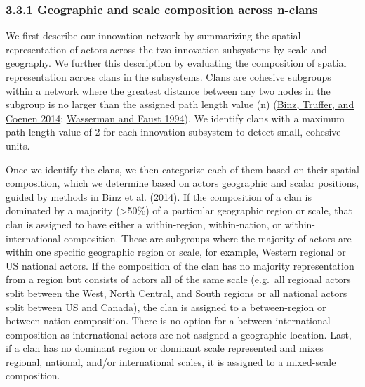 \documentclass[twoside,12pt,final]{ucthesis-CA2012}
\begin{document}
\begin{ucmainmatter}
\hypertarget{geographic-and-scale-composition-across-n-clans}{%
\subsubsection{3.3.1 Geographic and scale composition across n-clans}\label{geographic-and-scale-composition-across-n-clans}}

We first describe our innovation network by summarizing the spatial
representation of actors across the two innovation subsystems by scale
and geography. We further this description by evaluating the composition
of spatial representation across clans in the subsystems. Clans are
cohesive subgroups within a network where the greatest distance between
any two nodes in the subgroup is no larger than the assigned path length
value (n)
(\protect\hyperlink{ref-Binz_Truffer_Coenen_2014}{Binz, Truffer, and Coenen 2014}; \protect\hyperlink{ref-Wasserman_Faust_1994}{Wasserman and Faust 1994}).
We identify clans with a maximum path length value of 2 for each
innovation subsystem to detect small, cohesive units.

Once we identify the clans, we then categorize each of them based on
their spatial composition, which we determine based on actors\textquotesingle{}
geographic and scalar positions, guided by methods in Binz et al.
(2014). If the composition of a clan is dominated by a majority (\textgreater50\%)
of a particular geographic region or scale, that clan is assigned to
have either a \textquotesingle within-region\textquotesingle, \textquotesingle within-nation\textquotesingle, or
\textquotesingle within-international\textquotesingle{} composition. These are subgroups where the
majority of actors are within one specific geographic region or scale,
for example, Western regional or US national actors. If the composition
of the clan has no majority representation from a region but consists of
actors all of the same scale (e.g.~all regional actors split between the
West, North Central, and South regions or all national actors split
between US and Canada), the clan is assigned to a \textquotesingle between-region\textquotesingle{} or
\textquotesingle between-nation\textquotesingle{} composition. There is no option for a
\textquotesingle between-international\textquotesingle{} composition as international actors are not
assigned a geographic location. Last, if a clan has no dominant region
or dominant scale represented and mixes regional, national, and/or
international scales, it is assigned to a \textquotesingle mixed-scale\textquotesingle{} composition.


\end{ucmainmatter}
\end{document}
